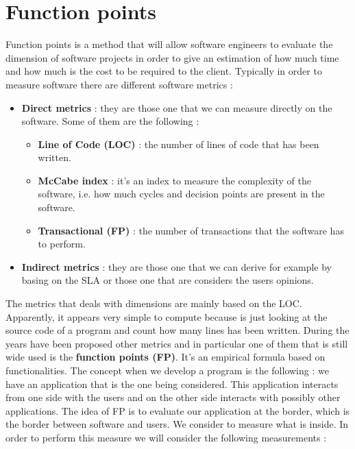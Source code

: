 \section{Function points}
Function points is a method that will allow software engineers to evaluate the dimension of software projects in order to give an estimation of how much time and how much is the cost to be required to the client. Typically in order to measure software there are different software metrics :
\begin{itemize}
    \item \textbf{Direct metrics} : they are those one that we can measure directly on the software. Some of them are the following :
          \begin{itemize}
              \item \textbf{Line of Code (LOC)} : the number of lines of code that has been written.
              \item \textbf{McCabe index} : it's an index to measure the complexity of the software, i.e. how much cycles and decision points are present in the software.
              \item \textbf{Transactional (FP)} : the number of transactions that the software has to perform.
          \end{itemize}
    \item \textbf{Indirect metrics} : they are those one that we can derive for example by basing on the SLA or those one that are considers the users opinions.
\end{itemize}
The metrics that deals with dimensions are mainly based on the LOC. Apparently, it appears very simple to compute because is just looking at the source code of a program and count how many lines has been written. During the years have been proposed other metrics and in particular one of them that is still wide used is the \textbf{function points (FP)}. It's an empirical formula based on functionalities. The concept when we develop a program is the following : we have an application that is the one being considered. This application interacts from one side with the users and on the other side interacts with possibly other applications. The idea of FP is to evaluate our application at the border, which is the border between software and users. We consider to measure what is inside. In order to perform this measure we will consider the following measurements :
